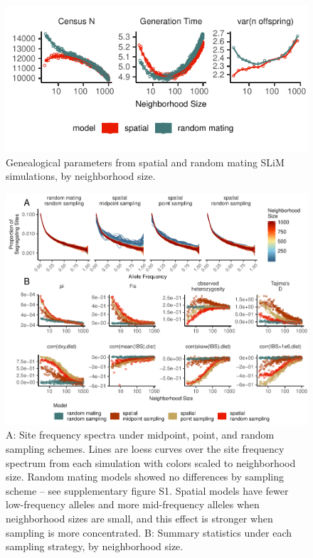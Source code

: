 \documentclass[9pt,twocolumn,twoside,lineno]{gsajnl}
\begin{document}
\begin{figure}[htbp]
\includegraphics{pop_params.pdf}
\caption{Genealogical parameters from spatial and random mating SLiM simulations, by neighborhood size.}
\label{fig:spectrum}
\end{figure}


\begin{figure}[p]
\centering
\includegraphics[width=\textwidth]{sfs_w_sumstats.pdf}
\caption{A: Site frequency spectra under midpoint, point, and random sampling schemes. Lines are loess curves over the site frequency spectrum from each simulation with colors scaled to neighborhood size. Random mating models showed no differences by sampling scheme -- see supplementary figure S1. Spatial models have fewer low-frequency alleles and more mid-frequency alleles when neighborhood sizes are small, and this effect is stronger when sampling is more concentrated. B: Summary statistics under each sampling strategy, by neighborhood size.}
\label{fig:spectrum}
\end{figure}
\end{document}
